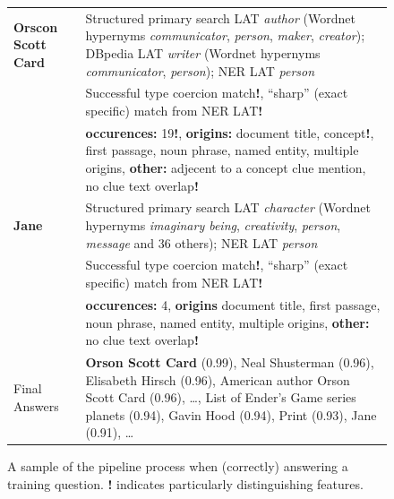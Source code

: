 \documentclass{poster15}
\begin{document}
\begin{figure}[t!]
\begin{tabular}{|p{1.8cm}p{6cm}|}
\textbf{Orscon Scott Card} & Structured primary search LAT \textit{author} (Wordnet hypernyms \textit{communicator}, \textit{person}, \textit{maker}, \textit{creator}); DBpedia LAT \textit{writer} (Wordnet hypernyms \textit{communicator}, \textit{person}); NER LAT \textit{person} \\
	& Successful type coercion match\textbf{!}, ``sharp'' (exact specific) match from NER LAT\textbf{!} \\
	& \textbf{occurences:} 19\textbf{!}, \textbf{origins:} document title, concept\textbf{!}, first passage, noun phrase, named entity, multiple origins, \textbf{other:} adjecent to a concept clue mention, no clue text overlap\textbf{!} \\
\textbf{Jane} & Structured primary search LAT \textit{character} (Wordnet hypernyms \textit{imaginary being}, \textit{creativity}, \textit{person}, \textit{message} and 36 others); NER LAT \textit{person} \\
	& Successful type coercion match\textbf{!}, ``sharp'' (exact specific) match from NER LAT\textbf{!} \\
	& \textbf{occurences:} 4, \textbf{origins} document title, first passage, noun phrase, named entity, multiple origins,
	\textbf{other:} no clue text overlap\textbf{!} \\ \hline

Final Answers & \textbf{Orson Scott Card} (0.99), Neal Shusterman (0.96), Elisabeth Hirsch (0.96), American author Orson Scott Card (0.96), \dots, List of Ender's Game series planets (0.94), Gavin Hood (0.94), Print (0.93), Jane (0.91), \dots \\ \hline
\end{tabular}
\vspace*{-0.2cm}
\caption{A sample of the pipeline process when (correctly) answering a training question. \textbf{!} indicates particularly distinguishing features.}
\label{fig:exEnder}
\end{figure}
\end{document}
